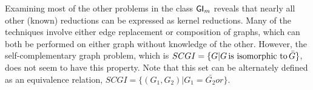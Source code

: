 Examining most of the other problems in the class ${\mathsf{GI}}_m$ reveals that nearly
all other (known) reductions can be expressed as kernel reductions. Many of the
techniques involve either edge replacement or composition of graphs, which can
both be performed on either graph without knowledge of the other. However, the
self-complementary graph problem, which is $SCGI=\{G|G \,\text{is isomorphic to}\,
\bar{G}\}$, does not seem to have this property. Note that this set can be
alternately defined as an equivalence relation, $SCGI=\{(G_1,
G_2)|G_1=\bar{G_2} or \}$.
